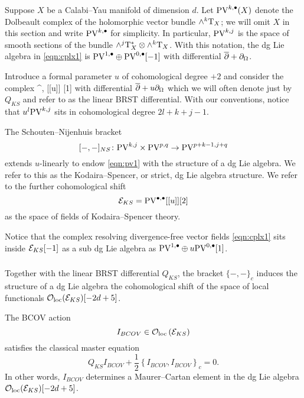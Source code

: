 \documentclass[11pt]{amsart}
\begin{document}
Suppose $X$ be a Calabi--Yau manifold of dimension $d$. 
Let ${\rm PV}^{k,\bullet}(X)$ denote the Dolbeault complex of the holomorphic vector bundle $\wedge^k {\rm T}_X$; we will omit $X$ in this section and write ${\rm PV}^{k,\bullet}$ for simplicity.
In particular, ${\rm PV}^{k,j}$ is the space of smooth sections of the bundle $\wedge^j {\rm T}_X^* \otimes \wedge^k {\rm T}_X$. 
With this notation, the dg Lie algebra in \eqref{eqn:cplx1} is ${\rm PV}^{1,\bullet} \oplus {\rm PV}^{0,\bullet}[-1]$ with differential $\overline{\partial} + \partial_{\Omega}$. 

Introduce a formal parameter $u$ of cohomological degree $+2$ and consider the complex 
\beqn\label{eqn:pv1}
\PV^{\bu,\bu} [[u]] [1]
\eeqn
with differential $\overline{\partial} + u \partial_{\Omega}$ which we will often denote just by $Q_{KS}$ and refer to as the linear BRST differential. 
With our conventions, notice that $u^l {\rm PV}^{k,j}$ sits in cohomological degree $2l +k + j - 1$. 

The Schouten--Nijenhuis bracket 
\[
[-,-]_{NS} \colon {\rm PV}^{k,j} \times {\rm PV}^{p,q} \to {\rm PV}^{p+k-1,j+q} 
\]
extends $u$-linearly to endow \eqref{eqn:pv1} with the structure of a dg Lie algebra.
We refer to this as the Kodaira--Spencer, or strict, dg Lie algebra structure.
We refer to the further cohomological shift 
\[
\mathcal E_{KS} = {\rm PV}^{\bullet,\bullet} [[u]] [2]
\]
as the space of fields of Kodaira--Spencer theory.

Notice that the complex resolving divergence-free vector fields \eqref{eqn:cplx1} sits inside $\mathcal E_{KS} [-1]$ as a sub dg Lie algebra as ${\rm PV}^{1,\bullet} \oplus u {\rm PV}^{0,\bullet}[1]$. 

\subsubsection{}


\subsubsection{}

Together with the linear BRST differential $Q_{KS}$, the bracket $\{-,-\}_c$ induces the structure of a dg Lie algebra the cohomological shift of the space of local functionals ${\mathcal O}_{\rm loc}(\mathcal E_{KS})[-2d+5]$. 

\begin{thm}
The BCOV action 
\[
I_{BCOV} \in {\mathcal O}_{\rm loc} \left(\mathcal E_{KS} \right) 
\]
satisfies the classical master equation 
\[
Q_{KS} I_{BCOV} + \frac12 \left\{I_{BCOV}, I_{BCOV}\right\}_c = 0 .
\]
In other words, $I_{BCOV}$ determines a Maurer--Cartan element in the dg Lie algebra ${\mathcal O}_{\rm loc}(\mathcal E_{KS})[-2d+5]$.
\end{thm}
\end{document}
